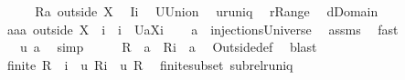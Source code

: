 \begin{isabellebody}
%
\isadelimproof
%
\endisadelimproof
%
\isatagproof
{}\isamarkupfalse%
\ {\isacharminus}\isanewline
\ \ \isamarkupfalse%
\ {\isacharquery}R{\isacharequal}{\isachardoublequoteopen}a\ outside\ X{\isachardoublequoteclose}\ \isamarkupfalse%
\ {\isacharquery}I{\isacharequal}{\isachardoublequoteopen}{\isacharbraceleft}i{\isacharbraceright}{\isachardoublequoteclose}\ \isamarkupfalse%
\ {\isacharquery}U{\isacharequal}Union\ \isamarkupfalse%
\ {\isacharquery}u{\isacharequal}runiq\ \isamarkupfalse%
\ {\isacharquery}r{\isacharequal}Range\ \isamarkupfalse%
\ {\isacharquery}d{\isacharequal}Domain\isanewline
\ \ \isamarkupfalse%
\ {\isacharquery}aa{\isacharequal}{\isachardoublequoteopen}a\ outside\ {\isacharparenleft}X\ {\isasymunion}\ {\isacharbraceleft}i{\isacharbraceright}{\isacharparenright}\ {\isasymunion}\ {\isacharparenleft}{\isacharbraceleft}i{\isacharbraceright}\ {\isasymtimes}\ {\isacharbraceleft}{\isacharquery}U{\isacharparenleft}a{\isacharbackquote}{\isacharbackquote}{\isacharparenleft}X{\isasymunion}{\isacharbraceleft}i{\isacharbraceright}{\isacharparenright}{\isacharparenright}{\isacharbraceright}{\isacharparenright}{\isachardoublequoteclose}\isanewline
\ \ \isamarkupfalse%
\ {\isachardoublequoteopen}a\ {\isasymin}\ injectionsUniverse{\isachardoublequoteclose}\ \isamarkupfalse%
\ assms\ \isamarkupfalse%
\ fast\ \isamarkupfalse%
\ \isamarkupfalse%
\ \isanewline
\ \ {}{\isacharcolon}\ {\isachardoublequoteopen}{\isacharquery}u\ a{\isachardoublequoteclose}\ \isamarkupfalse%
\ simp\isanewline
\ \ \isamarkupfalse%
\ \isamarkupfalse%
\ {\isachardoublequoteopen}{\isacharquery}R\ {\isasymsubseteq}\ a\ {\isacharampersand}\ {\isacharquery}R{\isacharminus}{\isacharminus}i\ {\isasymsubseteq}\ a{\isachardoublequoteclose}\ \isamarkupfalse%
\ Outside{\isacharunderscore}def\ \isamarkupfalse%
\ blast\isanewline
\ \ \isamarkupfalse%
\ \isamarkupfalse%
\ {\isachardoublequoteopen}finite\ {\isacharparenleft}{\isacharquery}R\ {\isacharminus}{\isacharminus}\ i{\isacharparenright}\ {\isacharampersand}\ {\isacharquery}u\ {\isacharparenleft}{\isacharquery}R{\isacharminus}{\isacharminus}i{\isacharparenright}\ {\isacharampersand}\ {\isacharquery}u\ {\isacharquery}R{\isachardoublequoteclose}\ \isamarkupfalse%
\ finite{\isacharunderscore}subset\ subrel{\isacharunderscore}runiq\isanewline

\end{isabellebody}
